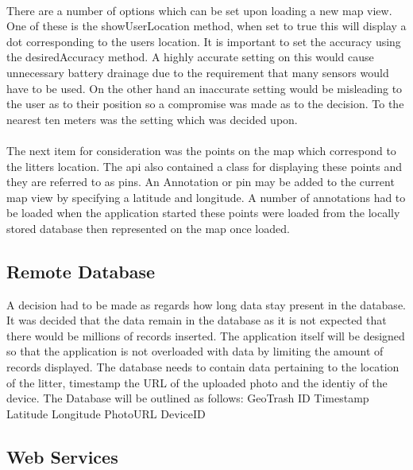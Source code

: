 \documentclass[12pt]{article}
\begin{document}
\paragraph{}

There are a number of options which can be set upon loading a new map view. One of these is the showUserLocation method, when set to true this will display a dot corresponding to the users location. It is important to set the accuracy using the desiredAccuracy method. A highly accurate setting on this would cause unnecessary battery drainage due to the requirement that many sensors would have to be used. On the other hand an inaccurate setting would be misleading to the user as to their position so a compromise was made as to the decision. To the nearest ten meters was the setting which was decided upon. 

\paragraph{}

The next item for consideration was the points on the map which correspond to the litters location. The \gls{api} also contained a class for displaying these points and they are referred to as pins. An Annotation or pin may be added to the current map view by specifying a latitude and longitude. A number of annotations had to be loaded when the application started these points were loaded from the locally stored database then represented on the map once loaded. 
\subsection{Remote Database}


A decision had to be made as regards how long data stay present in the database. It was decided that the data remain in the database as it is not expected that there would be millions of records inserted. The application itself will be designed so that the application is not overloaded with data by limiting the amount of records displayed. The database needs to contain data pertaining to the location of the litter, timestamp the URL of the uploaded photo and the identiy of the device. The Database will be outlined as follows:
GeoTrash
ID
Timestamp
Latitude
Longitude
PhotoURL
DeviceID

\subsection{Web Services}
\end{document}

